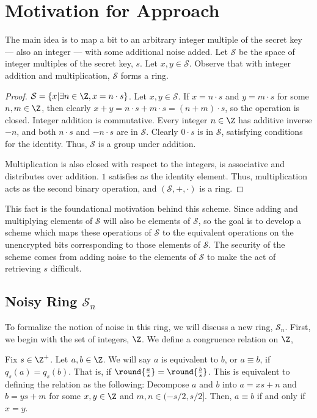 \documentclass[a4paper,11pt, oneside]{article}
\newcommand{\ring}{\mathcal{S}}
\newcommand{\nring}{\mathcal{S}_n}
\begin{document}
\section{Motivation for Approach}
The main idea is to map a bit to an arbitrary integer multiple of the secret key --- also an integer --- with some additional noise added.  Let $\ring$ be the space of integer multiples of the secret key, $s$.  Let $x,y\in \ring$.  Observe that with integer addition and multiplication, $\ring$ forms a ring.

\begin{proof}
  $\ring = \left\{ x | \exists n\in \Z, x = n\cdot s\right\}$.  Let $x,y\in \ring$. If $x = n\cdot s$ and $y = m\cdot s$ for some $n,m\in\Z$, then clearly $x+y = n\cdot s + m\cdot s = (n+m)\cdot s$, so the operation is closed.  Integer addition is commutative.  Every integer $n\in \Z$ has additive inverse $-n$, and both $n\cdot s$ and $-n\cdot s$ are in $\ring$.  Clearly $0\cdot s$ is in $\ring$, satisfying conditions for the identity.  Thus, $\ring$ is a group under addition.  
  
  Multiplication is also closed with respect to the integers, is associative and distributes over addition.  $1$ satisfies as the identity element.  Thus, multiplication acts as the second binary operation, and $(\ring, +, \cdot)$ is a ring.
\end{proof}

This fact is the foundational motivation behind this scheme.  Since adding and multiplying elements of $\ring$ will also be elements of $\ring$, so the goal is to develop a scheme which maps these operations of $\ring$ to the equivalent operations on the unencrypted bits corresponding to those elements of $\ring$.  The security of the scheme comes from adding noise to the elements of $\ring$ to make the act of retrieving $s$ difficult.

\subsection{Noisy Ring $\nring$}

To formalize the notion of noise in this ring, we will discuss a new ring, $\nring$.  First, we begin with the set of integers, $\Z$.  We define a congruence relation on $\Z$,
\begin{definition}
    Fix $s\in\Z^+$.  Let $a,b\in \Z$.  We will say $a$ is equivalent to $b$, or $a\equiv b$, if $q_s(a) = q_s(b)$.  That is, if $\round{\frac{a}{s}} = \round{\frac{b}{s}}$.  This is equivalent to defining the relation as the following:  Decompose $a$ and $b$ into $a = xs + n$ and $b = ys + m$ for some $x,y\in\Z$ and $m,n\in ( -s/2, s/2]$.  Then, $a\equiv b$ if and only if $x = y$.
\end{definition}
\end{document}
